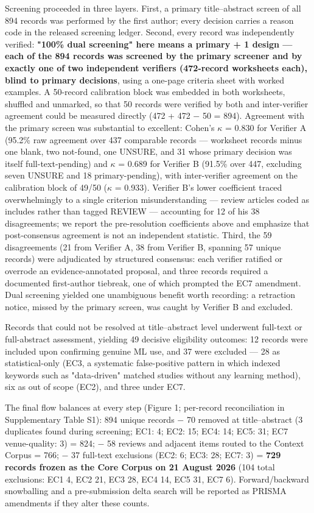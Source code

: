 \documentclass[pdflatex,sn-basic]{sn-jnl}
\begin{document}
Screening proceeded in three layers. First, a primary title--abstract screen of all 894 records was performed by the first author; every decision carries a reason code in the released screening ledger. Second, every record was independently verified: \textbf{"100\% dual screening" here means a primary + 1 design --- each of the 894 records was screened by the primary screener and by exactly one of two independent verifiers (472-record worksheets each), blind to primary decisions}, using a one-page criteria sheet with worked examples. A 50-record calibration block was embedded in both worksheets, shuffled and unmarked, so that 50 records were verified by both and inter-verifier agreement could be measured directly (472 + 472 $-$ 50 = 894). Agreement with the primary screen was substantial to excellent: Cohen's $\kappa$ = 0.830 for Verifier A (95.2\% raw agreement over 437 comparable records --- worksheet records minus one blank, two not-found, one UNSURE, and 31 whose primary decision was itself full-text-pending) and $\kappa$ = 0.689 for Verifier B (91.5\% over 447, excluding seven UNSURE and 18 primary-pending), with inter-verifier agreement on the calibration block of 49/50 ($\kappa$ = 0.933). Verifier B's lower coefficient traced overwhelmingly to a single criterion misunderstanding --- review articles coded as includes rather than tagged REVIEW --- accounting for 12 of his 38 disagreements; we report the pre-resolution coefficients above and emphasize that post-consensus agreement is not an independent statistic. Third, the 59 disagreements (21 from Verifier A, 38 from Verifier B, spanning 57 unique records) were adjudicated by structured consensus: each verifier ratified or overrode an evidence-annotated proposal, and three records required a documented first-author tiebreak, one of which prompted the EC7 amendment. Dual screening yielded one unambiguous benefit worth recording: a retraction notice, missed by the primary screen, was caught by Verifier B and excluded.

Records that could not be resolved at title--abstract level underwent full-text or full-abstract assessment, yielding 49 decisive eligibility outcomes: 12 records were included upon confirming genuine ML use, and 37 were excluded --- 28 as statistical-only (EC3, a systematic false-positive pattern in which indexed keywords such as "data-driven" matched studies without any learning method), six as out of scope (EC2), and three under EC7.

The final flow balances at every step (Figure 1; per-record reconciliation in Supplementary Table S1): 894 unique records $-$ 70 removed at title--abstract (3 duplicates found during screening; EC1: 4; EC2: 15; EC4: 14; EC5: 31; EC7 venue-quality: 3) = 824; $-$ 58 reviews and adjacent items routed to the Context Corpus = 766; $-$ 37 full-text exclusions (EC2: 6; EC3: 28; EC7: 3) = \textbf{729 records frozen as the Core Corpus on 21 August 2026} (104 total exclusions: EC1 4, EC2 21, EC3 28, EC4 14, EC5 31, EC7 6). Forward/backward snowballing and a pre-submission delta search will be reported as PRISMA amendments if they alter these counts.
\end{document}
